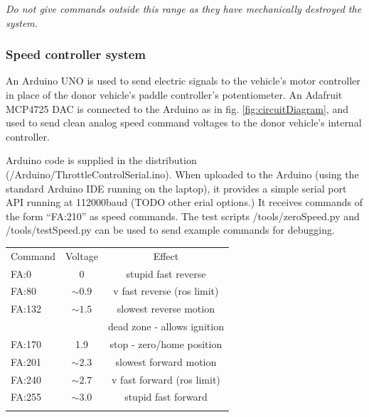 \documentclass[a4paper]{article}
\begin{document}
{\em Do not give commands outside this range as they have mechanically destroyed the system.}  


\subsubsection{Speed controller system}

An Arduino UNO \cite{oxer2011practical} is used to send electric signals to the vehicle's motor controller in place of the donor vehicle’s paddle controller’s potentiometer.    An Adafruit MCP4725 DAC is connected to the Arduino as in fig. \ref{fig:circuitDiagram}, and used to send clean analog speed command voltages to the donor vehicle’s internal controller.

Arduino code is supplied in the distribution (/Arduino/ThrottleControlSerial.ino). When uploaded to the Arduino (using the standard Arduino IDE running on the laptop), it provides a simple serial port API running at 112000baud (TODO other erial options.)  It receives commands of the form “FA:210” as speed commands.   The test scripts /tools/zeroSpeed.py and /tools/testSpeed.py can be used to send example commands for debugging.

\begin{center}
	\begin{tabular}{ l c c }
		\hline
		Command   &    Voltage            &  Effect \\
		FA:0      &    0                  & stupid fast reverse  \\
		FA:80     &    $\sim 0.9$         & v fast reverse (ros limit) \\
		FA:132    &   $\sim 1.5$          & slowest reverse motion  \\
		&                       & dead zone - allows ignition \\
		FA:170    &    1.9                & stop - zero/home position \\
		FA:201    &    $\sim 2.3$         & slowest forward motion \\
		FA:240    &    $\sim 2.7$         & v fast forward (ros limit) \\
		FA:255    &    $\sim 3.0$         & stupid fast forward \\
		\hline\\
	\end{tabular}
\end{center}    
\end{document}
